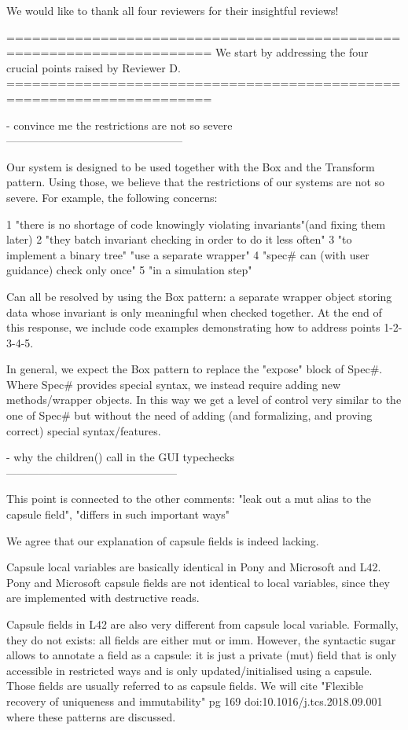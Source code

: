 We would like to thank all four reviewers for their insightful reviews!

======================================================================
We start by addressing the four crucial points raised by Reviewer D.
======================================================================

- convince me the restrictions are not so severe
------------------------------------------------

Our system is designed to be used together with the Box and the Transform pattern.
Using those, we believe that the restrictions of our systems are not so severe.
For example, the following concerns:

1 "there is no shortage of code knowingly violating invariants"(and fixing them later)
2 "they batch invariant checking in order to do it less often"
3 "to implement a binary tree" "use a separate wrapper"
4 "spec# can (with user guidance) check only once"
5 "in a simulation step"

Can all be resolved by using the Box pattern: a separate wrapper object storing data
whose invariant is only meaningful when checked together.
At the end of this response, we include code examples demonstrating how to address points 1-2-3-4-5.

In general, we expect the Box pattern to replace the "expose" block of Spec#.
Where Spec# provides special syntax, we instead require adding new methods/wrapper
objects. In this way we get a level of control very similar to the one of Spec# but without the need of adding (and formalizing, and proving correct) special syntax/features.

- why the children() call in the GUI typechecks
-----------------------------------------------

This point is connected to the other comments: "leak out a mut alias to the capsule field", "differs in such important ways"

We agree that our explanation of capsule fields is indeed lacking.

Capsule local variables are basically identical in Pony and Microsoft and L42.
Pony and Microsoft capsule fields are not identical to local variables, since they are implemented with destructive reads.

Capsule fields in L42 are also very different from capsule local variable.
Formally, they do not exists: all fields are either mut or imm.
However, the syntactic sugar allows to annotate a field as a capsule:
it is just a private (mut) field that is only
accessible in restricted ways and is only updated/initialised using a capsule.
Those fields are usually referred to as capsule fields.
We will cite "Flexible recovery of uniqueness and immutability" 
pg 169 doi:10.1016/j.tcs.2018.09.001 where these patterns are discussed.

